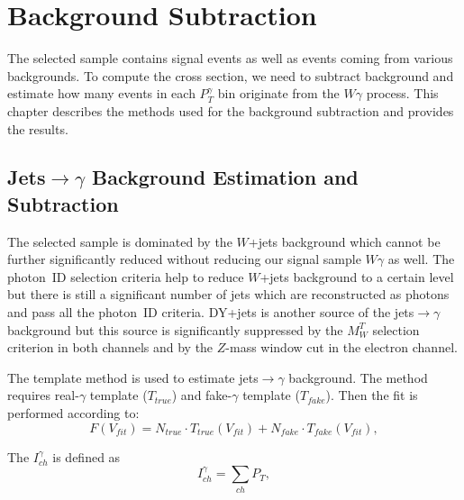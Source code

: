 \section{Background Subtraction}
\label{sec:BackgroundSubtraction}

The selected sample contains signal events as well as events coming from various backgrounds. To compute the cross section, we need to subtract background and estimate how many events in each $P_T^\gamma$ bin originate from the $W\gamma$ process. This chapter describes the methods used for the background subtraction and provides the results.

\subsection{Jets$\rightarrow\gamma$ Background Estimation and Subtraction}
\label{sec:BackgroundSubtraction_jtog}

The selected sample is dominated by the $W$+jets background which cannot be further significantly reduced without reducing our signal sample $W\gamma$ as well. The photon~ID selection criteria help to reduce $W$+jets background to a certain level but there is still a significant number of jets which are reconstructed as photons and pass all the photon~ID criteria. DY+jets is another source of the jets$\rightarrow \gamma$ background but this source is significantly suppressed by the $M_W^T$ selection criterion in both channels and by the $Z$-mass window cut in the electron channel.

The template method is used to estimate jets$ \rightarrow \gamma$ background. The method requires real-$\gamma$ template ($T_{true}$) and fake-$\gamma$ template ($T_{fake}$). Then the fit is performed according to: 
\begin{equation}
F(V_{fit})=N_{true} \cdot T_{true}(V_{fit}) + N_{fake} \cdot T_{fake}(V_{fit}),
\end{equation}

The $I_{ch}^{\gamma}$ is defined as
\begin{equation}
  I_{ch}^{\gamma} = \sum_{ch} P_T,
\end{equation} 

